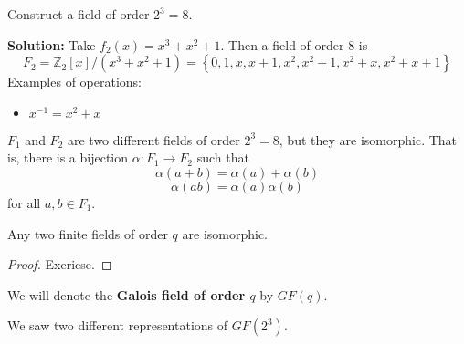 \begin{exbox}
    \begin{example}
    Construct a field of order $ 2^3=8 $.

    \textbf{Solution:} Take $ f_2(x)=x^3+x^2+1 $. Then a field of order $ 8 $ is
    \[ F_2=\mathbb{Z}_2[x]/(x^3+x^2+1)=\left\{ 0,1,x,x+1,x^2,x^2+1,x^2+x,x^2+x+1\right\} \]
    Examples of operations:
    \begin{itemize}
        \item $ x^{-1}=x^2+x $
    \end{itemize}
\end{example}
\end{exbox}

 $ F_1 $ and $ F_2 $ are two different fields of order $ 2^3=8 $,
but they are isomorphic. That is,
there is a bijection $ \alpha : F_1\rightarrow F_2 $ such that
\[ \alpha(a+b)=\alpha(a)+\alpha(b) \]
\[ \alpha(ab)=\alpha(a)\alpha(b) \]
for all $ a,b\in F_1 $.

\begin{thmbox}
    \begin{theorem}
        Any two finite fields of order $ q $ are isomorphic.
    \end{theorem}
\end{thmbox}

\begin{proof}
    Exericse.
\end{proof}

\begin{defbox}
    \begin{definition}
        We will denote the \textbf{Galois field of order $ q $} by $ GF(q) $.
    \end{definition}
\end{defbox}
We saw two different representations of $ GF(2^3) $.
